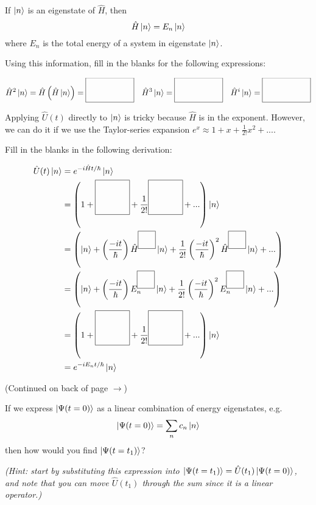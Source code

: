 	\begin{questions}
	
		\vspace{0.2in}
		\question If $\ket{n}$ is an eigenstate of $\hat H$, then
			\begin{equation*}
				\hat H\ket{n} = E_n\ket{n}
			\end{equation*}	
			where $E_n$ is the total energy of a system in eigenstate $\ket{n}$.
			
			Using this information, fill in the blanks for the following expressions:
			
			\begin{align*}
				\hat H^2\ket{n} = \hat H \left(\hat H \ket{n}\right) =  \raisebox{-2ex}{\framebox(60,30){}} & & \hat H^3 \ket{n} =   \raisebox{-2ex}{\framebox(60,30){}} & & \hat H^i \ket{n} =  \raisebox{-2ex}{\framebox(60,30){}}
			\end{align*}
			
			\vspace{0.1in}
		\question Applying $\hat U(t)$ directly to $\ket{n}$ is tricky because $\hat H$ is in the exponent. However, we can do it if we use the Taylor-series expansion $e^x \approx 1 + x + \frac{1}{2!} x^2 + ...$.
		
			Fill in the blanks in the following derivation:
			
			\begin{align*}
				\hat U(t)\ket{n} &= e^{-i\hat H t/\hbar}\ket{n}\\
				&= \left(1 + \raisebox{-2ex}{\framebox(40,40){}} + \frac{1}{2!}\raisebox{-2ex}{\framebox(40,40){}}  + ...\right)\ket{n}\\
				&= \left( \ket{n} + \left(\frac{-it}{\hbar}\right)\hat H^{\framebox(20,20){}}\ket{n} + \frac{1}{2!} \left(\frac{-it}{\hbar}\right)^2\hat H^{\framebox(20,20){}}\ket{n} + ...\right)\\
				&= \left( \ket{n} + \left(\frac{-it}{\hbar}\right) E_n^{\framebox(20,20){}}\ket{n} + \frac{1}{2!} \left(\frac{-it}{\hbar}\right)^2 E_n^{\framebox(20,20){}}\ket{n} + ...\right)\\
				&= \left(1 + \raisebox{-2ex}{\framebox(40,40){}} + \frac{1}{2!}\raisebox{-2ex}{\framebox(40,40){}}  + ...\right)\ket{n}\\
				&= e^{-i E_n t/\hbar}\ket{n}
			\end{align*}
			
			\vspace{0.2in}
			\begin{flushright}(Continued on back of page $\rightarrow$)	\end{flushright}
		
		\newpage
		\question If we express $\ket{\Psi(t=0)}$ as a linear combination of energy eigenstates, e.g.
			\begin{equation*}
				\ket{\Psi(t=0)} = \sum_n c_n \ket{n}
			\end{equation*}
			then how would you find $\ket{\Psi(t=t_1)}$?
			
			\emph{(Hint: start by substituting this expression into $\ket{\Psi(t=t_1)} = \hat U(t_1)\ket{\Psi(t=0)}$, and note that you can move $\hat U(t_1)$ through the sum since it is a linear operator.)}
	
	\end{questions}
